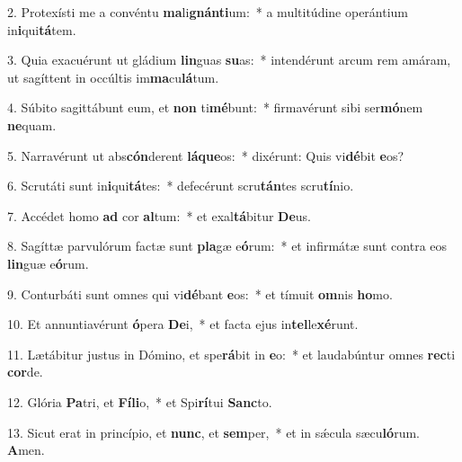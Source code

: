 2. Protexísti me a convéntu \textbf{ma}li\textbf{gnán}\textbf{ti}um:~*  a multitúdine operántium in\textbf{i}qui\textbf{tá}tem.\

3. Quia exacuérunt ut gládium \textbf{lin}guas \textbf{su}as:~*  intendérunt arcum rem amáram, ut sagíttent in occúltis im\textbf{ma}cu\textbf{lá}tum.\

4. Súbito sagittábunt eum, et \textbf{non} ti\textbf{mé}bunt:~*  firmavérunt sibi ser\textbf{mó}nem \textbf{ne}quam.\

5. Narravérunt ut abs\textbf{cón}derent \textbf{lá}\textbf{que}os:~*  dixérunt: Quis vi\textbf{dé}bit \textbf{e}os?\

6. Scrutáti sunt in\textbf{i}qui\textbf{tá}tes:~*  defecérunt scru\textbf{tán}tes scru\textbf{tí}nio.\

7. Accédet homo \textbf{ad} cor \textbf{al}tum:~*  et exal\textbf{tá}bitur \textbf{De}us.\

8. Sagíttæ parvulórum factæ sunt \textbf{pla}gæ e\textbf{ó}rum:~*  et infirmátæ sunt contra eos \textbf{lin}guæ e\textbf{ó}rum.\

9. Conturbáti sunt omnes qui vi\textbf{dé}bant \textbf{e}os:~*  et tímuit \textbf{om}nis \textbf{ho}mo.\

10. Et annuntiavérunt \textbf{ó}pera \textbf{De}i,~*  et facta ejus in\textbf{tel}le\textbf{xé}runt.\

11. Lætábitur justus in Dómino, et spe\textbf{rá}bit in \textbf{e}o:~*  et laudabúntur omnes \textbf{rec}ti \textbf{cor}de.\

12. Glória \textbf{Pa}tri, et \textbf{Fí}\textbf{li}o,~*  et Spi\textbf{rí}tui \textbf{Sanc}to.\

13. Sicut erat in princípio, et \textbf{nunc}, et \textbf{sem}per,~*  et in sǽcula sæcu\textbf{ló}rum. \textbf{A}men.\


